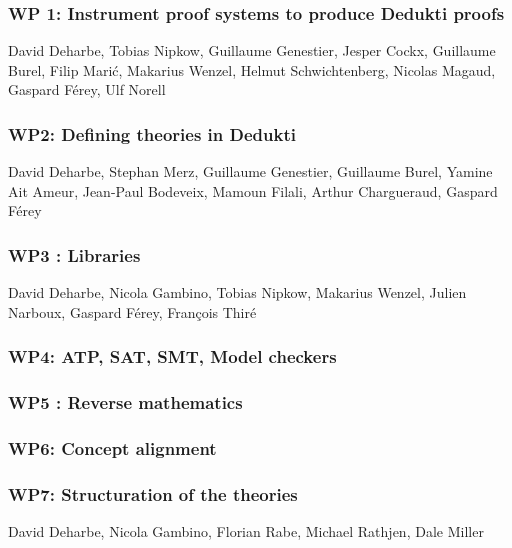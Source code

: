 \subsubsection{WP 1: Instrument proof systems to produce Dedukti proofs}

David Deharbe, Tobias Nipkow, Guillaume Genestier, Jesper
Cockx, Guillaume Burel, Filip Marić, Makarius Wenzel, Helmut
Schwichtenberg, Nicolas Magaud, Gaspard Férey, Ulf Norell



\subsubsection{WP2: Defining theories in Dedukti}

David Deharbe, Stephan Merz, Guillaume Genestier, Guillaume
Burel, Yamine Ait Ameur, Jean-Paul Bodeveix, Mamoun Filali, Arthur
Chargueraud, Gaspard Férey



\subsubsection{WP3 : Libraries}

David Deharbe, Nicola Gambino, Tobias Nipkow, Makarius Wenzel,
Julien Narboux, Gaspard Férey, François Thiré



\subsubsection{WP4: ATP, SAT, SMT, Model checkers}



\subsubsection{WP5 : Reverse mathematics}



\subsubsection{WP6: Concept alignment}



\subsubsection{WP7: Structuration of the theories}

David Deharbe, Nicola Gambino, Florian Rabe, Michael Rathjen,
Dale Miller



